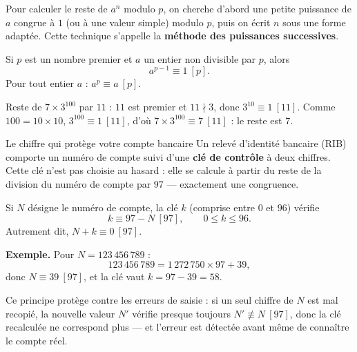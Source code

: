 \begin{astucebac}
	Pour calculer le reste de $a^n$ modulo $p$, on cherche d'abord une petite puissance de $a$
	congrue à $1$ (ou à une valeur simple) modulo $p$, puis on écrit $n$ sous une forme adaptée.
	Cette technique s'appelle la \textbf{méthode des puissances successives}.
\end{astucebac}

\begin{theoreme}
	Si $p$ est un nombre premier et $a$ un entier non divisible par $p$, alors
	$$
	a^{p-1} \equiv 1\ [p].
	$$
	Pour tout entier $a$ : $a^p \equiv a\ [p]$.
\end{theoreme}

\begin{exemple}
	Reste de $7 \times 3^{100}$ par $11$ : $11$ est premier et $11 \nmid 3$, donc
	$3^{10} \equiv 1\ [11]$. Comme $100 = 10 \times 10$, $3^{100} \equiv 1\ [11]$,
	d'où $7 \times 3^{100} \equiv 7\ [11]$ : le reste est $7$.
\end{exemple}

\begin{vraievie}{Le chiffre qui protège votre compte bancaire}
	Un relevé d'identité bancaire (RIB) comporte un numéro de compte suivi
	d'une \textbf{clé de contrôle} à deux chiffres. Cette clé n'est pas
	choisie au hasard : elle se calcule à partir du reste de la division du
	numéro de compte par $97$ --- exactement une congruence.

	Si $N$ désigne le numéro de compte, la clé $k$ (comprise entre $0$ et
	$96$) vérifie
	\[
	k \equiv 97 - N\ [97], \qquad 0\leqslant k\leqslant 96.
	\]
	Autrement dit, $N+k \equiv 0\ [97]$.

	\textbf{Exemple.} Pour $N = 123\,456\,789$ :
	\[
	123\,456\,789 = 1\,272\,750 \times 97 + 39,
	\]
	donc $N \equiv 39\ [97]$, et la clé vaut $k = 97-39 = 58$.

	Ce principe protège contre les erreurs de saisie : si un seul chiffre de
	$N$ est mal recopié, la nouvelle valeur $N'$ vérifie presque toujours
	$N' \not\equiv N\ [97]$, donc la clé recalculée ne correspond plus --- et
	l'erreur est détectée avant même de connaître le compte réel.

\end{vraievie}


